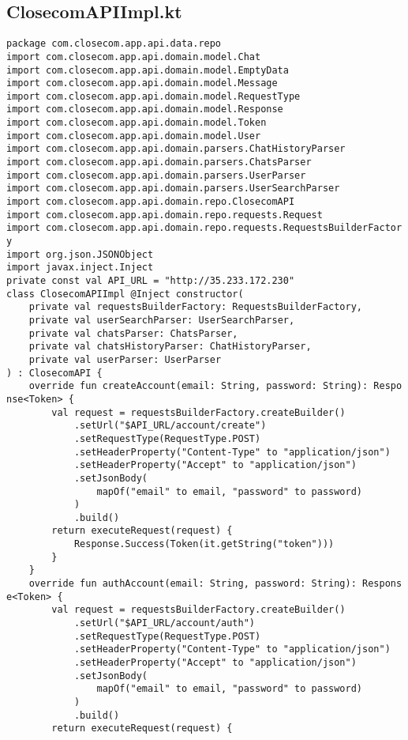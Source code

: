 \documentclass[listing]{espd}
\begin{document}
\subsection{ClosecomAPIImpl.kt}
\begin{verbatim}
package com.closecom.app.api.data.repo
import com.closecom.app.api.domain.model.Chat
import com.closecom.app.api.domain.model.EmptyData
import com.closecom.app.api.domain.model.Message
import com.closecom.app.api.domain.model.RequestType
import com.closecom.app.api.domain.model.Response
import com.closecom.app.api.domain.model.Token
import com.closecom.app.api.domain.model.User
import com.closecom.app.api.domain.parsers.ChatHistoryParser
import com.closecom.app.api.domain.parsers.ChatsParser
import com.closecom.app.api.domain.parsers.UserParser
import com.closecom.app.api.domain.parsers.UserSearchParser
import com.closecom.app.api.domain.repo.ClosecomAPI
import com.closecom.app.api.domain.repo.requests.Request
import com.closecom.app.api.domain.repo.requests.RequestsBuilderFactor
y
import org.json.JSONObject
import javax.inject.Inject
private const val API_URL = "http://35.233.172.230"
class ClosecomAPIImpl @Inject constructor(
    private val requestsBuilderFactory: RequestsBuilderFactory,
    private val userSearchParser: UserSearchParser,
    private val chatsParser: ChatsParser,
    private val chatsHistoryParser: ChatHistoryParser,
    private val userParser: UserParser
) : ClosecomAPI {
    override fun createAccount(email: String, password: String): Respo
nse<Token> {
        val request = requestsBuilderFactory.createBuilder()
            .setUrl("$API_URL/account/create")
            .setRequestType(RequestType.POST)
            .setHeaderProperty("Content-Type" to "application/json")
            .setHeaderProperty("Accept" to "application/json")
            .setJsonBody(
                mapOf("email" to email, "password" to password)
            )
            .build()
        return executeRequest(request) {
            Response.Success(Token(it.getString("token")))
        }
    }
    override fun authAccount(email: String, password: String): Respons
e<Token> {
        val request = requestsBuilderFactory.createBuilder()
            .setUrl("$API_URL/account/auth")
            .setRequestType(RequestType.POST)
            .setHeaderProperty("Content-Type" to "application/json")
            .setHeaderProperty("Accept" to "application/json")
            .setJsonBody(
                mapOf("email" to email, "password" to password)
            )
            .build()
        return executeRequest(request) {

\end{verbatim}
\end{document}
